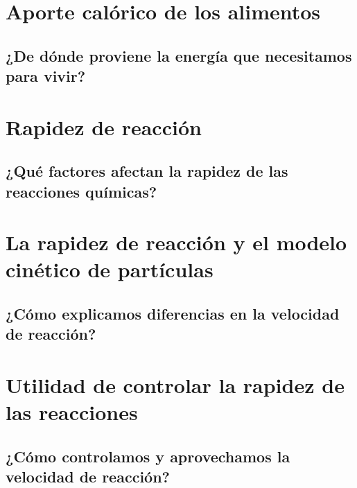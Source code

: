 \documentclass[11pt]{book}
\begin{document}
\newpage \thispagestyle{plain}
\section{Aporte calórico de los alimentos}
\subsection{¿De dónde proviene la energía que necesitamos para vivir?}

\newpage \thispagestyle{plain}
\section{Rapidez de reacción}
\subsection{¿Qué factores afectan la rapidez de las reacciones químicas?}

\newpage \thispagestyle{plain}
\section{La rapidez de reacción y el modelo cinético de partículas}
\subsection{¿Cómo explicamos diferencias en la velocidad de reacción?}

\newpage \thispagestyle{plain}
\section{Utilidad de controlar la rapidez de las reacciones}
\subsection{¿Cómo controlamos y aprovechamos la velocidad de reacción?}
\end{document}
